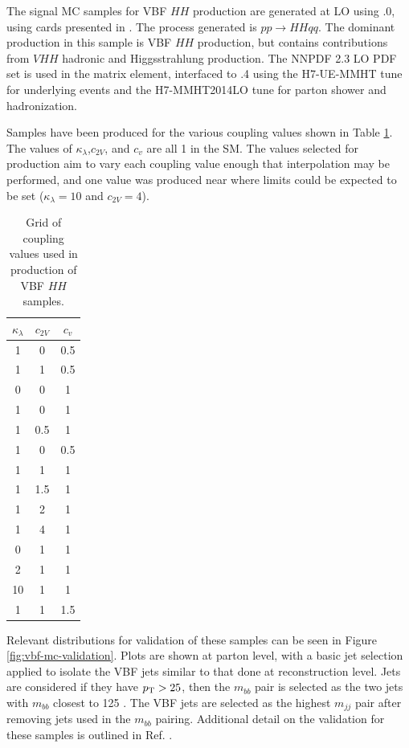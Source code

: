 The signal MC samples for VBF $HH$ production are generated at LO using .0, using cards presented in \cite{vbfhh}. The process generated is $pp \rightarrow HHqq$. The dominant production in this sample is VBF $HH$ production, but contains contributions from $VHH$  hadronic and Higgsstrahlung production. The NNPDF 2.3 LO PDF set \cite{NNPDF} is used in the matrix element, interfaced to .4 using the H7-UE-MMHT tune for underlying events and the H7-MMHT2014LO tune for parton shower and hadronization.

Samples have been produced for the various coupling values shown in Table \ref{tab:vbf-coupling-samples}. The values of $\kappa_\lambda$,$c_{2V}$, and $c_{v}$ are all 1 in the SM. The values selected for production aim to vary each coupling value enough that interpolation may be performed, and one value was produced near where limits could be expected to be set ($\kappa_\lambda = 10$ and $c_{2V}=4$).

\begin{table}[htbp]
    \centering
    \caption{Grid of coupling values used in production of VBF $HH$ samples.}
    \begin{tabular}{c|c|c}
        $\kappa_\lambda$ & $c_{2V}$ & $c_{v}$ \\
        \hline
        1 & 0 & 0.5 \\
        1 & 1 & 0.5 \\
        0 & 0 & 1 \\
        1 & 0 & 1 \\
        1 & 0.5 & 1 \\
        1 & 0 & 0.5 \\
        1 & 1 & 1 \\
        1 & 1.5 & 1 \\
        1 & 2 & 1 \\
        1 & 4 & 1 \\
        0 & 1 & 1 \\
        2 & 1 & 1 \\
        10 & 1 & 1 \\
        1 & 1 & 1.5
    \end{tabular}
    \label{tab:vbf-coupling-samples}
\end{table}

Relevant distributions for validation of these samples can be seen in Figure \ref{fig:vbf-mc-validation}. Plots are shown at parton level, with a basic jet selection applied to isolate the VBF jets similar to that done at reconstruction level. Jets are considered if they have $p_{\text{T}} > 25$, then the $m_{bb}$ pair is selected as the two jets with $m_{bb}$ closest to 125 \GeV. The VBF jets are selected as the highest $m_{jj}$ pair after removing jets used in the $m_{bb}$ pairing. Additional detail on the validation for these samples is outlined in Ref. \cite{mc-validation}.


